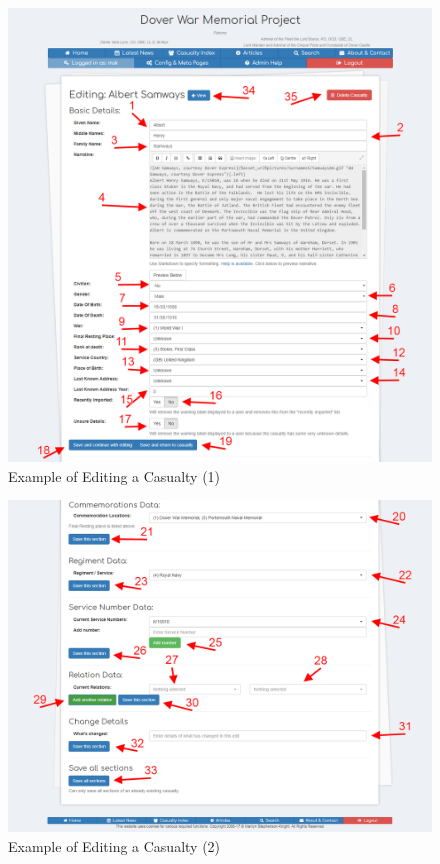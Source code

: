 \documentclass[12pt]{article}
\begin{document}
\begin{figure}[h]
  \centering
 \includegraphics[width=.9\textwidth]{pics/edit_casualty.png}
	\caption{Example of Editing a Casualty (1)}\label{fig:edit_casualty}
\end{figure}
\newpage
\begin{figure}[h]
  \centering
 \includegraphics[width=.9\textwidth]{pics/edit_casualty2.png}
	\caption{Example of Editing a Casualty (2)}\label{fig:edit_casualty2}
\end{figure}
\end{document}
